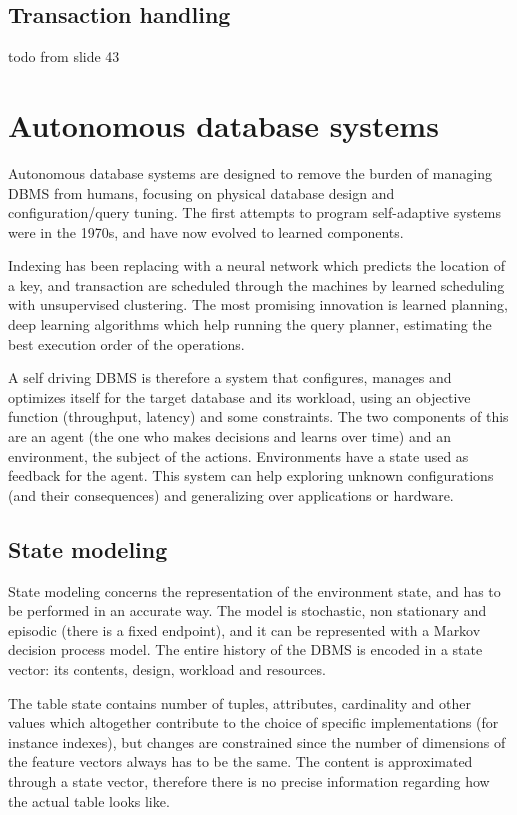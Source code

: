 
\subsection{Transaction handling}
todo from slide 43

\section{Autonomous database systems}
Autonomous database systems are designed to remove the burden of managing DBMS from humans, focusing on physical database design and configuration/query tuning. The first attempts to program self-adaptive systems were in the 1970s, and have now evolved to learned components. 

Indexing has been replacing with a neural network which predicts the location of a key, and transaction are scheduled through the machines by learned scheduling with unsupervised clustering. The most promising innovation is learned planning, deep learning algorithms which help running the query planner, estimating the best execution order of the operations. 

A self driving DBMS is therefore a system that configures, manages and optimizes itself for the target database and its workload, using an objective function (throughput, latency) and some constraints. The two components of this are an agent (the one who makes decisions and learns over time) and an environment, the subject of the actions. Environments have a state used as feedback for the agent. This system can help exploring unknown configurations (and their consequences) and generalizing over applications or hardware.

\subsection{State modeling}
State modeling concerns the representation of the environment state, and has to be performed in an accurate way. The model is stochastic, non stationary and episodic (there is a fixed endpoint), and it can be represented with a Markov decision process model. The entire history of the DBMS is encoded in a state vector: its contents, design, workload and resources.

The table state contains number of tuples, attributes, cardinality and other values which altogether contribute to the choice of specific implementations (for instance indexes), but changes are constrained since the number of dimensions of the feature vectors always has to be the same. The content is approximated through a state vector, therefore there is no precise information regarding how the actual table looks like. 

